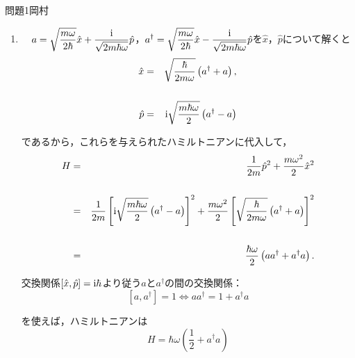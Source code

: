 \documentclass[fleqn]{jbook}
\def\ds{\displaystyle}
\begin{document}
\begin{answer}{問題1}{岡村}
\setcounter{equation}{0}
\begin{enumerate}

  \item 　$\ds a = \sqrt {\frac{{m\omega }}{{2\hbar }}} \hat x + \frac{{\rm i}}{{\sqrt {2m\hbar \omega } }}\hat p$，$\ds a^{\dagger} = \sqrt {\frac{{m\omega }}{{2\hbar }}} \hat x - \frac{{\rm i}}{{\sqrt {2m\hbar \omega } }}\hat p$を$\hat x$，$\hat p$について解くと
  \begin{eqnarray}
  \hat x &=& \sqrt {\frac{\hbar }{{2m\omega }}} \left( {a^{\dagger}  + a} \right) ,  \\ 
  & & \cr
  \hat p &=& {\rm i}\sqrt {\frac{{m\hbar \omega }}{2}} \left( {a^{\dagger}  - a} \right)  
  \end{eqnarray}
  
  であるから，これらを与えられたハミルトニアンに代入して，
  \begin{eqnarray}
  H &=& \frac{1}{{2m}}\hat p^2  + \frac{{m\omega ^2 }}{2}\hat x^2  \cr 
  & & \cr
   &=& \frac{1}{{2m}}\left[ {{\rm i}\sqrt {\frac{{m\hbar \omega }}{2}} \left( {a^{\dagger}  - a} \right)} \right]^2  + \frac{{m\omega ^2 }}{2}\left[ {\sqrt {\frac{\hbar }{{2m\omega }}} \left( {a^{\dagger}  + a} \right)} \right]^2  \cr 
   & & \cr
   &=& \frac{{\hbar \omega }}{2}\left( {aa^{\dagger}  + a^{\dagger} a} \right) . 
  \end{eqnarray}
  
  交換関係$\left[ {\hat x,\hat p} \right] = {\rm i}\hbar $より従う$a$と$a^{\dagger}$の間の交換関係：
  \begin{equation}
\left[ {a,a^{\dagger} } \right] = 1 \iff aa^{\dagger}  = 1 + a^{\dagger} a 
  \end{equation}
  
  を使えば，ハミルトニアンは
  \begin{equation}
H = \hbar \omega \left( {\frac{1}{2} + a^{\dagger} a} \right) 
  \end{equation}
  

\end{enumerate}
\end{answer}
\end{document}

